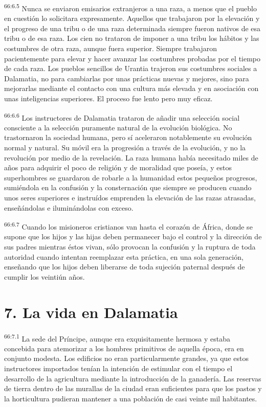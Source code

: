 \par
\textsuperscript{66:6.5} Nunca se enviaron emisarios extranjeros a una raza, a menos que el pueblo en cuestión lo solicitara expresamente. Aquellos que trabajaron por la elevación y el progreso de una tribu o de una raza determinada siempre fueron nativos de esa tribu o de esa raza. Los cien no trataron de imponer a una tribu los hábitos y las costumbres de otra raza, aunque fuera superior. Siempre trabajaron pacientemente para elevar y hacer avanzar las costumbres probadas por el tiempo de cada raza. Los pueblos sencillos de Urantia trajeron sus costumbres sociales a Dalamatia, no para cambiarlas por unas prácticas nuevas y mejores, sino para mejorarlas mediante el contacto con una cultura más elevada y en asociación con unas inteligencias superiores. El proceso fue lento pero muy eficaz.

\par
\textsuperscript{66:6.6} Los instructores de Dalamatia trataron de añadir una selección social consciente a la selección puramente natural de la evolución biológica. No trastornaron la sociedad humana, pero sí aceleraron notablemente su evolución normal y natural. Su móvil era la progresión a través de la evolución, y no la revolución por medio de la revelación. La raza humana había necesitado miles de años para adquirir el poco de religión y de moralidad que poseía, y estos superhombres se guardaron de robarle a la humanidad estos pequeños progresos, sumiéndola en la confusión y la consternación que siempre se producen cuando unos seres superiores e instruídos emprenden la elevación de las razas atrasadas, enseñándolas e iluminándolas con exceso.

\par
\textsuperscript{66:6.7} Cuando los misioneros cristianos van hasta el corazón de
África, donde se supone que los hijos y las hijas deben permanecer bajo el control y la dirección de sus padres mientras éstos vivan, sólo provocan la confusión y la ruptura de toda autoridad cuando intentan reemplazar esta práctica, en una sola generación, enseñando que los hijos deben liberarse de toda sujeción paternal después de cumplir los veintiún años.

\section*{7. La vida en Dalamatia}
\par
\textsuperscript{66:7.1} La sede del Príncipe, aunque era exquisitamente hermosa y estaba concebida para atemorizar a los hombres primitivos de aquella época, era en conjunto modesta. Los edificios no eran particularmente grandes, ya que estos instructores importados tenían la intención de estimular con el tiempo el desarrollo de la agricultura mediante la introducción de la ganadería. Las reservas de tierra dentro de las murallas de la ciudad eran suficientes para que los pastos y la horticultura pudieran mantener a una población de casi veinte mil habitantes.


